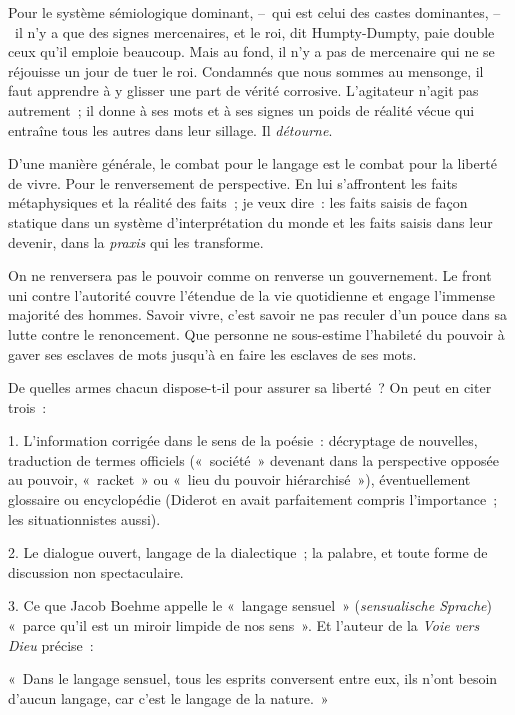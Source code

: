\documentclass[french,twoside]{book} %
\newenvironment{quoteblock}%
  {\begin{quoting}}
  {\end{quoting}}
\newenvironment{quotebar}{%
    \def\FrameCommand{{\color{rubric!10!}\vrule width 0.5em} \hspace{0.9em}}%
    \def\OuterFrameSep{\itemsep} %
    \MakeFramed {\advance\hsize-\width \FrameRestore}
  }%
  {%
    \endMakeFramed
  }
\renewenvironment{quoteblock}%
  {%
    \savenotes
    \setstretch{0.9}
    \normalfont
    \begin{quotebar}
  }
  {%
    \end{quotebar}
    \spewnotes
  }
\begin{document}
Pour le système sémiologique dominant, – qui est celui des castes dominantes, – il n’y a que des signes mercenaires, et le roi, dit Humpty-Dumpty, paie double ceux qu’il emploie beaucoup. Mais au fond, il n’y a pas de mercenaire qui ne se réjouisse un jour de tuer le roi. Condamnés que nous sommes au mensonge, il faut apprendre à y glisser une part de vérité corrosive. L’agitateur n’agit pas autrement ; il donne à ses mots et à ses signes un poids de réalité vécue qui entraîne tous les autres dans leur sillage. Il \emph{détourne}.\par
D’une manière générale, le combat pour le langage est le combat pour la liberté de vivre. Pour le renversement de perspective. En lui s’affrontent les faits métaphysiques et la réalité des faits ; je veux dire : les faits saisis de façon statique dans un système d’interprétation du monde et les faits saisis dans leur devenir, dans la \emph{praxis} qui les transforme.\par
On ne renversera pas le pouvoir comme on renverse un gouvernement. Le front uni contre l’autorité couvre l’étendue de la vie quotidienne et engage l’immense majorité des hommes. Savoir vivre, c’est savoir ne pas reculer d’un pouce dans sa lutte contre le renoncement. Que personne ne sous-estime l’habileté du pouvoir à gaver ses esclaves de mots jusqu’à en faire les esclaves de ses mots.\par
De quelles armes chacun dispose-t-il pour assurer sa liberté ? On peut en citer trois :\par
1. L’information corrigée dans le sens de la poésie : décryptage de nouvelles, traduction de termes officiels (« société » devenant dans la perspective opposée au pouvoir, « racket » ou « lieu du pouvoir hiérarchisé »), éventuellement glossaire ou encyclopédie (Diderot en avait parfaitement compris l’importance ; les situationnistes aussi).\par
2. Le dialogue ouvert, langage de la dialectique ; la palabre, et toute forme de discussion non spectaculaire.\par
3. Ce que Jacob Boehme appelle le « langage sensuel » (\emph{sensualische Sprache}) « parce qu’il est un miroir limpide de nos sens ». Et l’auteur de la \emph{Voie vers Dieu} précise :\par

\begin{quoteblock}
\noindent « Dans le langage sensuel, tous les esprits conversent entre eux, ils n’ont besoin d’aucun langage, car c’est le langage de la nature. »\end{quoteblock}
\end{document}
